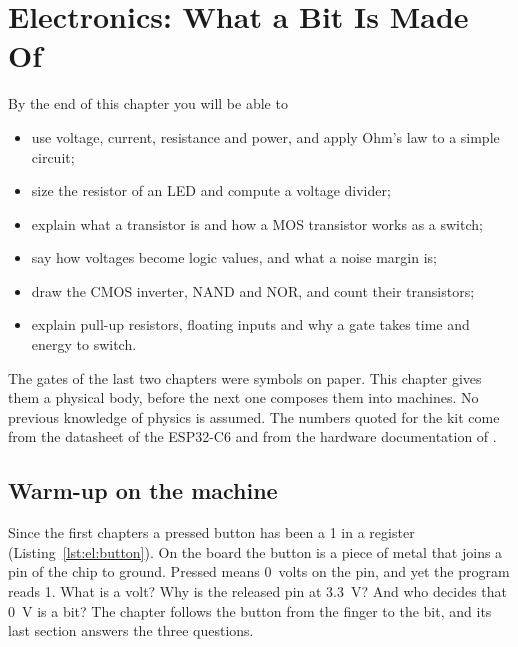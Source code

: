 \chapter{Electronics: What a Bit Is Made Of}
\label{ch:electronics}


\begin{chapgoals}
By the end of this chapter you will be able to
\begin{itemize}
\item use voltage, current, resistance and power, and apply Ohm's law to a simple circuit;
\item size the resistor of an LED and compute a voltage divider;
\item explain what a transistor is and how a MOS transistor works as a switch;
\item say how voltages become logic values, and what a noise margin is;
\item draw the CMOS inverter, NAND and NOR, and count their transistors;
\item explain pull-up resistors, floating inputs and why a gate takes time and energy to switch.
\end{itemize}
\end{chapgoals}


The gates of the last two chapters were symbols on paper. This chapter gives
them a physical body, before the next one composes them into machines. No
previous knowledge of physics is assumed. The numbers quoted for the kit come
from the datasheet of the ESP32-C6 \citep{esp32c6trm} and from the hardware
documentation of \prg.

\section{Warm-up on the machine}


Since the first chapters a pressed button has been a 1 in a register
(Listing~\ref{lst:el:button}). On the board the button is a piece of metal
that joins a pin of the chip to ground. Pressed means 0~volts on the pin, and
yet the program reads 1. What is a volt? Why is the released pin at 3.3~V?
And who decides that 0~V is a bit? The chapter follows the button from the
finger to the bit, and its last section answers the three questions.

